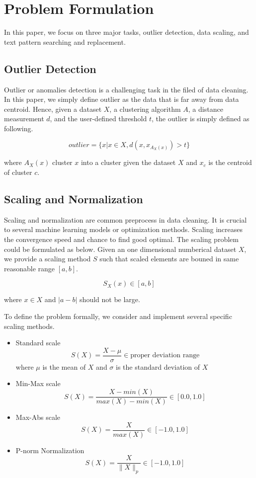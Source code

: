 \documentclass[sigconf]{acmart}
\begin{document}
\section{Problem Formulation}
In this paper, we focus on three major tasks, outlier detection, data scaling, and text pattern searching and replacement.
\subsection{Outlier Detection}
Outlier or anomalies detection is a challenging task in the filed of data cleaning\cite{anomal}. In this paper, we simply define outlier as the data that is far away from data centroid. Hence, given a dataset $X$, a clustering algorithm $A$\cite{MMD}, a distance measurement $d$, and the user-defined threshold $t$, the outlier is simply defined as following.

\[ outlier = \{x | x \in X, d( x, x_{A_X(x)} ) > t \}  \]

where $A_X(x)$ cluster $x$ into a cluster given the dataset $X$ and $x_c$  is the centroid of cluster $c$.

\subsection{Scaling and Normalization}
Scaling and normalization are common preprocess in data cleaning. It is crucial to several machine learning models or optimization methods. Scaling increases the convergence speed and chance to find good optimal\cite{convex}. The scaling problem could be formulated as below.
Given an one dimensional numberical dataset $X$, we provide a scaling method $S$ such that scaled elements are bouned in same reasonable range $[a, b]$.

\[ S_X(x) \in [a, b]\] 

where $x \in X$ and $|a - b|$ should not be large.

To define the problem formally, we consider and implement several specific scaling methods.
\begin{itemize}
	\item{Standard scale}
		\[ S(X) = \dfrac{X-\mu}{\sigma} \in \text{proper deviation range}\]
		where $\mu$ is the mean of $X$ and $\sigma$ is the standard deviation of $X$
	\item{Min-Max scale}
		\[ S(X) = \dfrac{X-min(X)}{max(X) - min(X)}\in [0.0, 1.0] \]
	\item{Max-Abs scale}
		\[ S(X) = \dfrac{X}{max(X)} \in [-1.0, 1.0] \]
	\item{P-norm Normalization}
		\[ S(X) = \dfrac{X}{\|X\|_{p}} \in [-1.0, 1.0]\]
\end{itemize}
\end{document}
